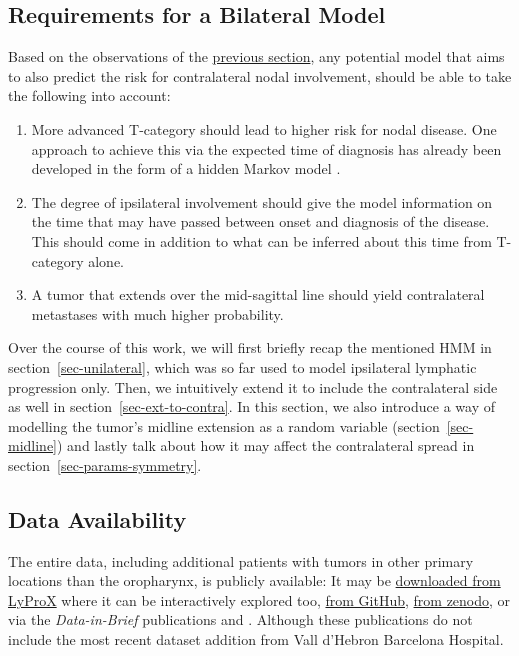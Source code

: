\documentclass[
  sn-mathphys-num,
]{sn-jnl}
\providecommand{\tightlist}{%
  \setlength{\itemsep}{0pt}\setlength{\parskip}{0pt}}\usepackage{longtable,booktabs,array}
\begin{document}
\subsection{Requirements for a Bilateral Model}\label{sec-requirements}

Based on the observations of the \hyperref[sec-data-strat]{previous
section}, any potential model that aims to also predict the risk for
contralateral nodal involvement, should be able to take the following
into account:

\begin{enumerate}
\def\labelenumi{\arabic{enumi}.}
\tightlist
\item
  More advanced T-category should lead to higher risk for nodal disease.
  One approach to achieve this via the expected time of diagnosis has
  already been developed in the form of a hidden Markov model
  \citep{ludwig_hidden_2021}.
\item
  The degree of ipsilateral involvement should give the model
  information on the time that may have passed between onset and
  diagnosis of the disease. This should come in addition to what can be
  inferred about this time from T-category alone.
\item
  A tumor that extends over the mid-sagittal line should yield
  contralateral metastases with much higher probability.
\end{enumerate}

Over the course of this work, we will first briefly recap the mentioned
HMM in section~\ref{sec-unilateral}, which was so far used to model
ipsilateral lymphatic progression only. Then, we intuitively extend it
to include the contralateral side as well in
section~\ref{sec-ext-to-contra}. In this section, we also introduce a
way of modelling the tumor's midline extension as a random variable
(section~\ref{sec-midline}) and lastly talk about how it may affect the
contralateral spread in section~\ref{sec-params-symmetry}.

\subsection{Data Availability}\label{data-availability}

The entire data, including additional patients with tumors in other
primary locations than the oropharynx, is publicly available: It may be
\href{https://lyprox.org/patients/dataset}{downloaded from LyProX} where
it can be interactively explored too,
\href{https://github.com/rmnldwg/lydata}{from GitHub},
\href{https://zenodo.org/search?q=lydata}{from zenodo}, or via the
\emph{Data-in-Brief} publications \citet{ludwig_dataset_2022} and
\citet{ludwig_multicentric_2023}. Although these publications do not
include the most recent dataset addition from Vall d'Hebron Barcelona
Hospital.
\end{document}
